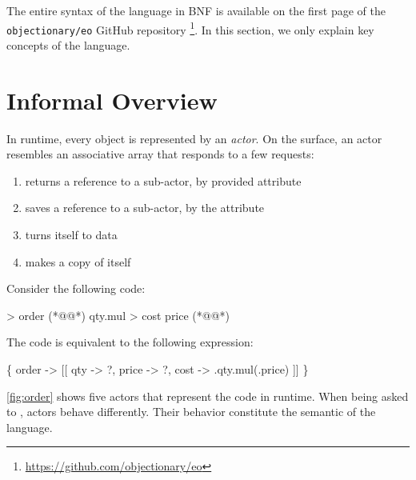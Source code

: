 


The entire syntax of the \eolang{} language in BNF is available on the first page of the \texttt{objectionary/eo} GitHub repository%
  \footnote{\url{https://github.com/objectionary/eo}}.
In this section, we only explain key concepts of the language.

\section{Informal Overview}

In runtime, every \eolang{} object is represented by an \emph{actor}.
On the surface, an actor resembles an associative array that responds to a few requests:
\begin{enumerate}
  \item {} returns a reference to a sub-actor, by provided attribute
  \item {} saves a reference to a sub-actor, by the attribute
  \item {} turns itself to data
  \item {} makes a copy of itself
\end{enumerate}

Consider the following code:

\begin{ffcode}
 > order (*@\label{ln:order-start}@*)
  qty.mul > cost
    price (*@\label{ln:order-stop}@*)
\end{ffcode}

The code is equivalent to the following \phic{} expression:
\begin{phiquation*}
\Big\{ order -> [[ qty -> ?, price -> ?, cost -> \xi.qty.mul(\xi.price) ]] \Big\}
\end{phiquation*}

\cref{fig:order} shows five actors that represent the code in runtime.
When being asked to , actors behave differently.
Their behavior constitute the semantic of the language.

